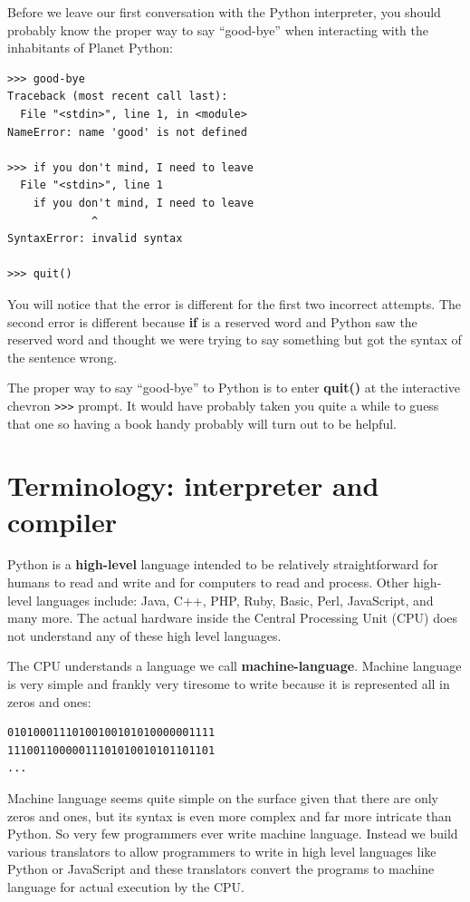 \documentclass[11pt]{book}
\begin{document}
Before we leave our first conversation with the Python 
interpreter, you should probably know the proper way
to say ``good-bye'' when interacting with the inhabitants
of Planet Python:

\beforeverb
\begin{verbatim}
>>> good-bye
Traceback (most recent call last):
  File "<stdin>", line 1, in <module>
NameError: name 'good' is not defined

>>> if you don't mind, I need to leave
  File "<stdin>", line 1
    if you don't mind, I need to leave
             ^
SyntaxError: invalid syntax

>>> quit()
\end{verbatim}
\afterverb
%
You will notice that the error is different for the first two
incorrect attempts.   The second error is different because 
{\bf if} is a reserved word and Python saw the reserved word
and thought we were trying to say something but got the syntax
of the sentence wrong.

The proper way to say ``good-bye'' to Python is to enter 
{\bf quit()} at the interactive chevron {\tt >>>} prompt.
It would have probably taken you quite a while to guess that 
one so having a book handy probably will turn out 
to be helpful.

\section{Terminology: interpreter and compiler}

Python is a {\bf high-level} language intended to be relatively
straightforward for humans to read and write and for computers
to read and process.  Other high-level languages include: Java, C++,
PHP, Ruby, Basic, Perl, JavaScript, and many more.  The actual hardware
inside the Central Processing Unit (CPU) does not understand any
of these high level languages.

The CPU understands a language we call {\bf machine-language}.  Machine
language is very simple and frankly very tiresome to write because it 
is represented all in zeros and ones:

\beforeverb
\begin{verbatim}
01010001110100100101010000001111
11100110000011101010010101101101
...
\end{verbatim}
\afterverb
%
Machine language seems quite simple on the surface given that there 
are only zeros and ones, but its syntax is even more complex
and far more intricate than Python.  So very few programmers ever write
machine language.  Instead we build various translators to allow
programmers to write in high level languages like Python or JavaScript
and these translators convert the programs to machine language for actual
execution by the CPU.
\end{document}
